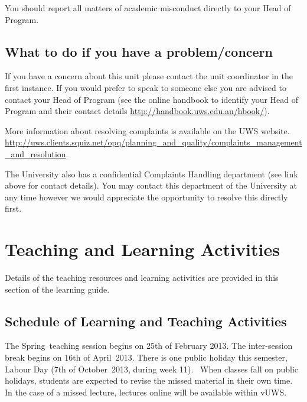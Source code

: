 \documentclass[a4paper,oneside]{book}
\newcommand{\vuws}{vUWS}
\newcommand{\teachingsession}{Spring}
\newcommand{\teachingsessiondate}{25th of February}
\newcommand{\teachingyear}{2013}
\newcommand{\intersessionbreak}{16th of April}
\newcommand{\labourdaydate}{7th of October}
\newcommand{\labourdayweek}{11}
\newcommand{\publicholidays}{
There is one public holiday
this semester, Labour Day (\labourdaydate~\teachingyear, during week
\labourdayweek).}
\begin{document}
You should report all matters of academic misconduct directly to your
Head of Program.

\section{What to do if you have a problem/concern}

If you have a concern about this unit please contact the unit
coordinator in the first instance.  If you would prefer to speak to
someone else you are advised to contact your Head of Program (see the
online handbook to identify your Head of Program and their contact
details \url{http://handbook.uws.edu.au/hbook/}).

More information about resolving complaints is available on the UWS
website. \url{http://uws.clients.squiz.net/opq/planning_and_quality/complaints_management_and_resolution}.

The University also has a confidential Complaints Handling department
(see link above for contact details).  You may contact this department
of the University at any time however we would appreciate the
opportunity to resolve this directly first.




\chapter{Teaching and Learning Activities}

Details of the teaching resources and learning activities are provided
in this section of the learning guide.


\section{Schedule of Learning and Teaching Activities}
The \teachingsession~teaching session begins on \teachingsessiondate
\teachingyear.  The inter-session break begins on
\intersessionbreak~\teachingyear.  \publicholidays~
When classes
fall on public holidays, students are expected to revise the missed
material in their own time. In the case of a missed lecture, lectures
online will be available within \vuws.
\end{document}
